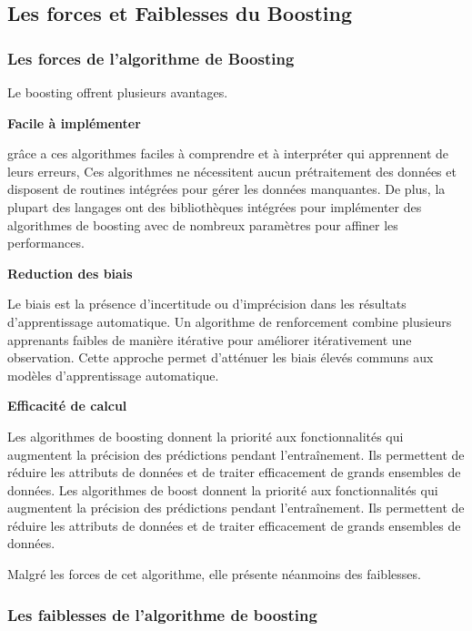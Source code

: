 \documentclass[french,a4paper,12pt]{article}
\begin{document}
\subsection{Les forces et Faiblesses du Boosting}


\subsubsection{ Les forces de l'algorithme de Boosting}

\quad Le boosting offrent plusieurs avantages.



\textbf{ Facile à implémenter }


\quad  grâce a ces algorithmes faciles à comprendre et à interpréter qui apprennent de leurs erreurs, Ces algorithmes ne nécessitent aucun prétraitement des données et disposent de routines intégrées pour gérer les données manquantes\citep{AWS}. De plus, la plupart des langages ont des bibliothèques intégrées pour implémenter des algorithmes de boosting avec de nombreux paramètres pour affiner les performances.



\textbf{Reduction des biais }



\quad Le biais est la présence d'incertitude ou d'imprécision dans les résultats d'apprentissage automatique. Un algorithme de renforcement combine plusieurs apprenants faibles de manière itérative pour améliorer itérativement une observation. Cette approche permet d'atténuer les biais élevés communs aux modèles d'apprentissage automatique.




\textbf{Efficacité de calcul }


\quad Les algorithmes de boosting donnent la priorité aux fonctionnalités qui augmentent la précision des prédictions pendant l'entraînement. Ils permettent de réduire les attributs de données et de traiter efficacement de grands ensembles de données. Les algorithmes de boost donnent la priorité aux fonctionnalités qui augmentent la précision des prédictions pendant l'entraînement. Ils permettent de réduire les attributs de données et de traiter efficacement de grands ensembles de données.

\quad Malgré les forces de cet algorithme, elle présente néanmoins des faiblesses. 


\subsubsection{Les faiblesses de l'algorithme de boosting}
\end{document}
